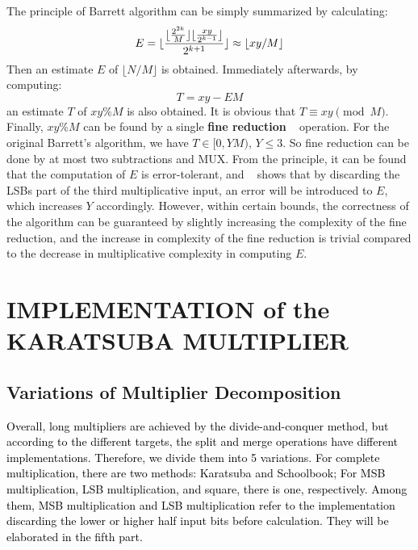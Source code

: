 \documentclass[conference]{IEEEtran}
\begin{document}
The principle of Barrett algorithm can be simply summarized by calculating:
\begin{equation}
    E = \lfloor {{\lfloor {2^{2k}\over M} \rfloor {\lfloor {xy \over {2^{k-1}}}} \rfloor}\over 2^{k+1}} \rfloor \approx \lfloor xy / M\rfloor
\end{equation}
Then an estimate $E$ of $\lfloor N / M\rfloor$ is obtained. Immediately afterwards, by computing:
\begin{equation}
    T = xy-EM
\end{equation}
an estimate $T$ of $xy \% M$ is also obtained. It is obvious that $T \equiv xy\pmod{M}$. Finally, $xy \% M$ can be found by a single \textbf{fine reduction} ~\cite{Efficient_FPGA_Modular_Multiplication_Implementation} operation. For the original Barrett's algorithm, we have $T \in [0, YM)$, $Y \le 3$. So fine reduction can be done by at most two subtractions and MUX. From the principle, it can be found that the computation of $E$ is error-tolerant, and ~\cite{Efficient_FPGA_Modular_Multiplication_Implementation} shows that by discarding the LSBs part of the third multiplicative input, an error will be introduced to $E$, which increases $Y$ accordingly. However, within certain bounds, the correctness of the algorithm can be guaranteed by slightly increasing the complexity of the fine reduction, and the increase in complexity of the fine reduction is trivial compared to the decrease in multiplicative complexity in computing $E$.


\section{IMPLEMENTATION of the KARATSUBA MULTIPLIER}

\subsection{Variations of Multiplier Decomposition}    %

\textcolor{black}{
Overall, long multipliers are achieved by the divide-and-conquer method, but according to the different targets, the split and merge operations have different implementations. Therefore, we divide them into 5 variations. For complete multiplication, there are two methods: Karatsuba and Schoolbook; For MSB multiplication, LSB multiplication, and square, there is one, respectively. Among them, MSB multiplication and LSB multiplication refer to the implementation discarding the lower or higher half input bits before calculation. They will be elaborated in the fifth part.
}
\end{document}
